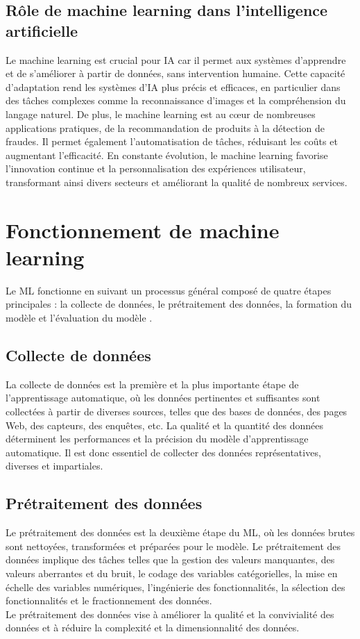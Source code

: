 \subsection{Rôle de machine learning dans l'intelligence artificielle}
Le machine learning est crucial pour IA car il permet aux systèmes d'apprendre et de s'améliorer à partir de données, sans intervention humaine. Cette capacité d'adaptation rend les systèmes d'IA plus précis et efficaces, en particulier dans des tâches complexes comme la reconnaissance d'images et la compréhension du langage naturel. De plus, le machine learning est au cœur de nombreuses applications pratiques, de la recommandation de produits à la détection de fraudes. Il permet également l'automatisation de tâches, réduisant les coûts et augmentant l'efficacité. En constante évolution, le machine learning favorise l'innovation continue et la personnalisation des expériences utilisateur, transformant ainsi divers secteurs et améliorant la qualité de nombreux services.

\section{Fonctionnement de machine learning}
Le ML fonctionne en suivant un processus général composé de quatre étapes principales : la collecte de données, le prétraitement des données, la formation du modèle et l'évaluation du modèle \cite{fastercapital_ml}.

\subsection{Collecte de données}
La collecte de données est la première et la plus importante étape de l'apprentissage automatique, où les données pertinentes et suffisantes sont collectées à partir de diverses sources, telles que des bases de données, des pages Web, des capteurs, des enquêtes, etc. La qualité et la quantité des données déterminent les performances et la précision du modèle d'apprentissage automatique. Il est donc essentiel de collecter des données représentatives, diverses et impartiales.

\subsection{Prétraitement des données}
Le prétraitement des données est la deuxième étape du ML, où les données brutes sont nettoyées, transformées et préparées pour le modèle. Le prétraitement des données implique des tâches telles que la gestion des valeurs manquantes, des valeurs aberrantes et du bruit, le codage des variables catégorielles, la mise en échelle des variables numériques, l'ingénierie des fonctionnalités, la sélection des fonctionnalités et le fractionnement des données.\\ 
Le prétraitement des données vise à améliorer la qualité et la convivialité des données et à réduire la complexité et la dimensionnalité des données.

